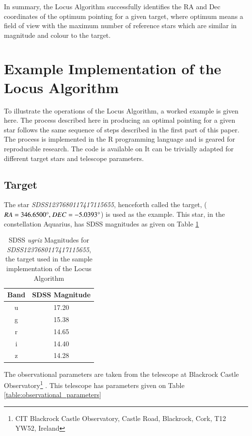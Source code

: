 \documentclass{aa}
\begin{document}
In summary, the Locus Algorithm successfully identifies the RA and Dec
coordinates of the optimum pointing for a given target, where optimum
means a field of view with the maximum number of reference stars which
are similar in magnitude and colour to the target.


\section{Example Implementation of the Locus Algorithm}
\label{example-implementation-of-the-locus-algorithm}

To illustrate the operations of the Locus Algorithm, a worked example is
given here. The process described here in producing an optimal pointing
for a given star follows the same sequence of steps described in the
first part of this paper. The process is implemented in the R
programming language and is geared for reproducible research. The code
is available on \citet{githubrepo}
It can be trivially adapted for different target stars and telescope
parameters.


\subsection{Target}
\label{target}

The star \textit{SDSS1237680117417115655}, henceforth called the target,
(${RA = 346.6500\degree,}\ {DEC = -5.0393\degree}$) is used as the example. This star, in
the constellation Aquarius, has SDSS magnitudes as given on Table \ref{table:target_mags}

\begin{table}[!htb]
\centering
\begin{tabular}{cc}
\hline\hline
Band & SDSS Magnitude\\
\hline
u & 17.20\\
g & 15.38\\
r & 14.65\\
i & 14.40\\
z & 14.28\\
\hline
\end{tabular}
 \caption{SDSS \textit{ugriz} Magnitudes for \textit{SDSS1237680117417115655}, the target used in the sample implementation of the Locus Algorithm}
 \label{table:target_mags} 
\end{table}

The observational parameters are taken from the telescope at
Blackrock Castle Observatory\footnote{CIT Blackrock Castle Observatory, Castle Road, Blackrock, Cork, T12 YW52, Ireland} . This telescope has
parameters given on Table \ref{table:observational_parameters}
\end{document}
